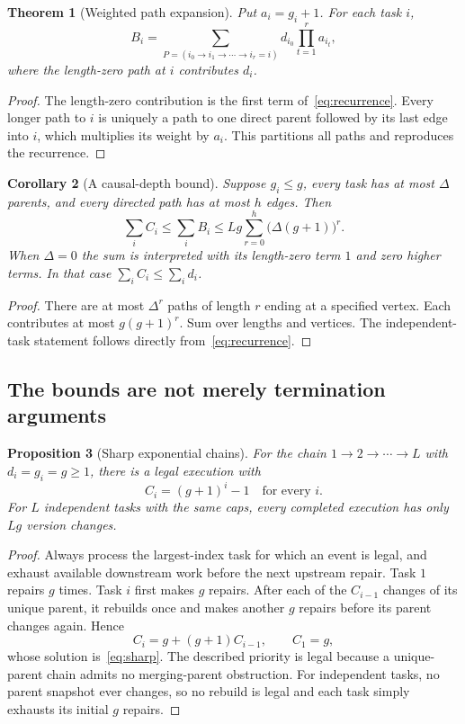 \documentclass[11pt]{article}
\newtheorem{theorem}{Theorem}[section]
\newtheorem{proposition}[theorem]{Proposition}
\newtheorem{corollary}[theorem]{Corollary}
\theoremstyle{definition}
\begin{document}
\begin{theorem}[Weighted path expansion]\label{thm:paths}
Put $a_i=g_i+1$. For each task $i$,
\begin{equation}\label{eq:paths}
 B_i=\sum_{P=(i_0\to i_1\to\cdots\to i_r=i)}
       d_{i_0}\prod_{t=1}^{r}a_{i_t},
\end{equation}
where the length-zero path at $i$ contributes $d_i$.
\end{theorem}
\begin{proof}
The length-zero contribution is the first term of~\eqref{eq:recurrence}. Every longer path to $i$ is uniquely a path to one direct parent followed by its last edge into $i$, which multiplies its weight by $a_i$. This partitions all paths and reproduces the recurrence.
\end{proof}

\begin{corollary}[A causal-depth bound]\label{cor:depth}
Suppose $g_i\leq g$, every task has at most $\Delta$ parents, and every directed path has at most $h$ edges. Then
\begin{equation}\label{eq:height}
 \sum_i C_i\leq\sum_i B_i
 \leq Lg\sum_{r=0}^{h}\bigl(\Delta(g+1)\bigr)^r.
\end{equation}
When $\Delta=0$ the sum is interpreted with its length-zero term $1$ and zero higher terms. In that case $\sum_i C_i\leq\sum_i d_i$.
\end{corollary}
\begin{proof}
There are at most $\Delta^r$ paths of length $r$ ending at a specified vertex. Each contributes at most $g(g+1)^r$. Sum over lengths and vertices. The independent-task statement follows directly from~\eqref{eq:recurrence}.
\end{proof}

\subsection{The bounds are not merely termination arguments}
\begin{proposition}[Sharp exponential chains]\label{prop:sharp}
For the chain $1\to2\to\cdots\to L$ with $d_i=g_i=g\geq1$, there is a legal execution with
\begin{equation}\label{eq:sharp}
 C_i=(g+1)^i-1
 \quad\text{for every }i.
\end{equation}
For $L$ independent tasks with the same caps, every completed execution has only $Lg$ version changes.
\end{proposition}
\begin{proof}
Always process the largest-index task for which an event is legal, and exhaust available downstream work before the next upstream repair. Task $1$ repairs $g$ times. Task $i$ first makes $g$ repairs. After each of the $C_{i-1}$ changes of its unique parent, it rebuilds once and makes another $g$ repairs before its parent changes again. Hence
\[
 C_i=g+(g+1)C_{i-1},\qquad C_1=g,
\]
whose solution is~\eqref{eq:sharp}. The described priority is legal because a unique-parent chain admits no merging-parent obstruction. For independent tasks, no parent snapshot ever changes, so no rebuild is legal and each task simply exhausts its initial $g$ repairs.
\end{proof}
\end{document}
